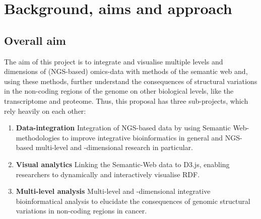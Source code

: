 \documentclass[twoside,fontsize=10pt]{article}
\begin{document}
\section*{Background, aims and approach}
\subsection*{Overall aim}
The aim of this project is to integrate and visualise multiple levels and dimensions of (NGS-based) omics-data with methods of the semantic web and, using these methods, further understand the consequences of structural variations in the non-coding regions of the genome on other biological levels, like the transcriptome and proteome. Thus, this proposal has three sub-projects, which rely heavily on each other:

\begin{enumerate}
\item \textbf{Data-integration} 
Integration of NGS-based data by using Semantic Web-methodologies to improve integrative bioinformatics in general and NGS-based multi-level and -dimensional research in particular.
\item \textbf{Visual analytics} 
Linking the Semantic-Web data to D3.js, enabling researchers to dynamically and interactively visualise RDF.
\item \textbf{Multi-level analysis} 
Multi-level and -dimensional integrative bioinformatical analysis to elucidate the consequences of genomic structural variations in non-coding regions in cancer.
\end{enumerate}
\end{document}
